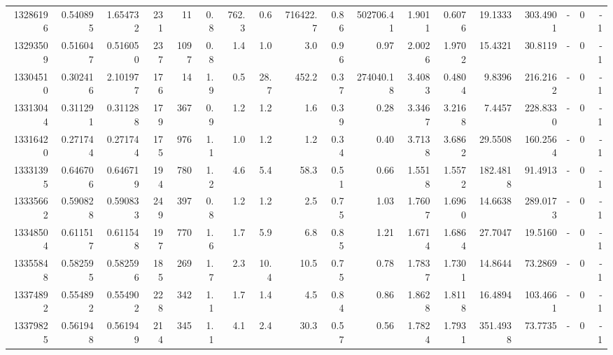 \begin{tabular}{rrrrrrrrrrrrrrrlrr}
  13286196 & 0.540895 &   1.654732 &  231 &   11 &      0.8 &    762.3 &     0.6 & 716422.7 &       0.86 &   502706.41 &  1.9011 &  0.6076 &   19.1333 &  303.4901 &             - &        0 &         -1 \\
  13293509 & 0.516047 &   0.516050 &  237 & 1097 &      0.8 &      1.4 &     1.0 &      3.0 &       0.96 &        0.97 &  2.0026 &  1.9702 &   15.4321 &   30.8119 &             - &        0 &         -1 \\
  13304510 & 0.302416 &   2.101977 &  176 &   14 &      1.9 &      0.5 &    28.7 &    452.2 &       0.37 &   274040.18 &  3.4083 &  0.4804 &    9.8396 &  216.2162 &             - &        0 &         -1 \\
  13313044 & 0.311291 &   0.311288 &  179 &  367 &      0.9 &      1.2 &     1.2 &      1.6 &       0.39 &        0.28 &  3.3467 &  3.2168 &    7.4457 &  228.8330 &             - &        0 &         -1 \\
  13316420 & 0.271744 &   0.271744 &  175 &  976 &      1.1 &      1.0 &     1.2 &      1.2 &       0.34 &        0.40 &  3.7138 &  3.6862 &   29.5508 &  160.2564 &             - &        0 &         -1 \\
  13331395 & 0.646706 &   0.646719 &  194 &  780 &      1.2 &      4.6 &     5.4 &     58.3 &       0.51 &        0.66 &  1.5518 &  1.5572 &  182.4818 &   91.4913 &             - &        0 &         -1 \\
  13335662 & 0.590828 &   0.590833 &  249 &  397 &      0.8 &      1.2 &     1.2 &      2.5 &       0.75 &        1.03 &  1.7607 &  1.6960 &   14.6638 &  289.0173 &             - &        0 &         -1 \\
  13348504 & 0.611517 &   0.611548 &  197 &  770 &      1.6 &      1.7 &     5.9 &      6.8 &       0.85 &        1.21 &  1.6714 &  1.6864 &   27.7047 &   19.5160 &             - &        0 &         -1 \\
  13355848 & 0.582595 &   0.582596 &  185 &  269 &      1.7 &      2.3 &    10.4 &     10.5 &       0.75 &        0.78 &  1.7837 &  1.7301 &   14.8644 &   73.2869 &             - &        0 &         -1 \\
  13374892 & 0.554892 &   0.554902 &  228 &  342 &      1.1 &      1.7 &     1.4 &      4.5 &       0.84 &        0.86 &  1.8628 &  1.8118 &   16.4894 &  103.4661 &             - &        0 &         -1 \\
  13379825 & 0.561948 &   0.561949 &  214 &  345 &      1.1 &      4.1 &     2.4 &     30.3 &       0.57 &        0.56 &  1.7824 &  1.7931 &  351.4938 &   73.7735 &             - &        0 &         -1 \\

\end{tabular}
